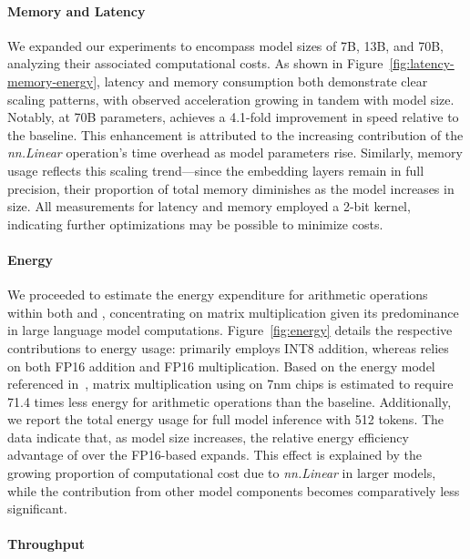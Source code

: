 \paragraph{Memory and Latency}

We expanded our experiments to encompass model sizes of 7B, 13B, and 70B, analyzing their associated computational costs. As shown in Figure~\ref{fig:latency-memory-energy}, latency and memory consumption both demonstrate clear scaling patterns, with observed acceleration growing in tandem with model size. Notably, at 70B parameters,  achieves a 4.1-fold improvement in speed relative to the  baseline. This enhancement is attributed to the increasing contribution of the \emph{nn.Linear} operation's time overhead as model parameters rise. Similarly, memory usage reflects this scaling trend—since the embedding layers remain in full precision, their proportion of total memory diminishes as the model increases in size. All measurements for latency and memory employed a 2-bit kernel, indicating further optimizations may be possible to minimize costs.

\paragraph{Energy}

We proceeded to estimate the energy expenditure for arithmetic operations within both  and , concentrating on matrix multiplication given its predominance in large language model computations. Figure~\ref{fig:energy} details the respective contributions to energy usage:  primarily employs INT8 addition, whereas  relies on both FP16 addition and FP16 multiplication. Based on the energy model referenced in~\cite{energycost, pokebnn}, matrix multiplication using  on 7nm chips is estimated to require 71.4 times less energy for arithmetic operations than the baseline. Additionally, we report the total energy usage for full model inference with 512 tokens. The data indicate that, as model size increases, the relative energy efficiency advantage of  over the FP16-based  expands. This effect is explained by the growing proportion of computational cost due to \emph{nn.Linear} in larger models, while the contribution from other model components becomes comparatively less significant.

\paragraph{Throughput}

